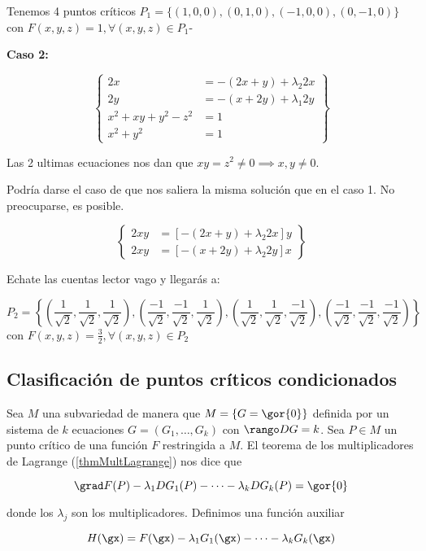 Tenemos 4 puntos críticos $P_1 = \{(1,0,0),(0,1,0),(-1,0,0),(0,-1,0)\}$ con $F(x,y,z) = 1, \forall (x,y,z)\in P_1$-

\textbf{Caso 2:}


\[\left\{\begin{array}{cc}
2x&= -(2x+y) + \lambda_2 2x\\
2y&= -(x+2y) + \lambda_1 2y\\
x^2+xy+y^2 -z^2 &= 1\\
x^2+y^2&=1
\end{array}\right\}\]

Las 2 ultimas ecuaciones nos dan que $xy = z^2 \neq 0 \implies x,y\neq 0$.

Podría darse el caso de que nos saliera la misma solución que en el caso 1. No preocuparse, es posible.

\[\left\{\begin{array}{cc}
2xy &= \left[-(2x+y)+\lambda_2 2x\right]y\\
2xy &= \left[-(x+2y)+\lambda_2 2y\right]x
\end{array}\right\}\]

Echate las cuentas lector vago y llegarás a:

\[P_2 = \left\{
\left(\frac{1}{\sqrt{2}},\frac{1}{\sqrt{2}},\frac{1}{\sqrt{2}}\right),
\left(\frac{-1}{\sqrt{2}},\frac{-1}{\sqrt{2}},\frac{1}{\sqrt{2}}\right),
\left(\frac{1}{\sqrt{2}},\frac{1}{\sqrt{2}},\frac{-1}{\sqrt{2}}\right),
\left(\frac{-1}{\sqrt{2}},\frac{-1}{\sqrt{2}},\frac{-1}{\sqrt{2}}\right)
\right\}\] con $F(x,y,z) = \frac{3}{2}, \forall (x,y,z)\in P_2$

\subsection{Clasificación de puntos críticos condicionados}

Sea $M$ una subvariedad de manera que $M=\{G = \gor{0}\}$ definida por un sistema de $k$ ecuaciones $G=(G_1,\dotsc,G_k)$ con $\rango DG = k$. Sea $P\in M$ un punto crítico de una función $F$ restringida a $M$. El teorema de los multiplicadores de Lagrange (\ref{thmMultLagrange}) nos dice que 

\[ \grad F(P) - \lambda_1 DG_1(P) - \dotsb -\lambda_kDG_k(P) = \gor{0} \]

donde los $\lambda_j$ son los multiplicadores. Definimos una función auxiliar 

\begin{equation} H(\gx) = F(\gx) - \lambda_1 G_1(\gx) - \dotsb - \lambda_k G_k(\gx)\label{eqClasAux} \end{equation}

